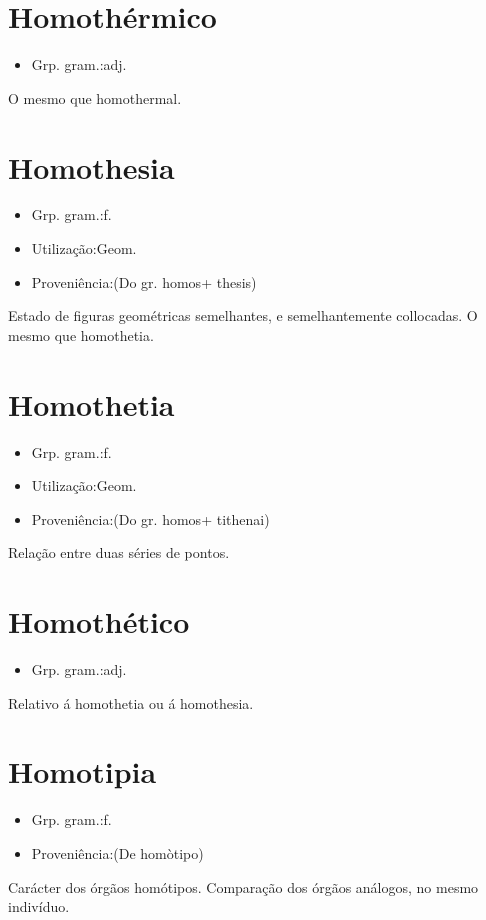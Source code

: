 \documentclass{article}
\begin{document}
\section{Homothérmico}
\begin{itemize}
\item {Grp. gram.:adj.}
\end{itemize}
O mesmo que \textunderscore homothermal\textunderscore .
\section{Homothesia}
\begin{itemize}
\item {Grp. gram.:f.}
\end{itemize}
\begin{itemize}
\item {Utilização:Geom.}
\end{itemize}
\begin{itemize}
\item {Proveniência:(Do gr. \textunderscore homos\textunderscore  + \textunderscore thesis\textunderscore )}
\end{itemize}
Estado de figuras geométricas semelhantes, e semelhantemente collocadas.
O mesmo que \textunderscore homothetia\textunderscore .
\section{Homothetia}
\begin{itemize}
\item {Grp. gram.:f.}
\end{itemize}
\begin{itemize}
\item {Utilização:Geom.}
\end{itemize}
\begin{itemize}
\item {Proveniência:(Do gr. \textunderscore homos\textunderscore  + \textunderscore tithenai\textunderscore )}
\end{itemize}
Relação entre duas séries de pontos.
\section{Homothético}
\begin{itemize}
\item {Grp. gram.:adj.}
\end{itemize}
Relativo á homothetia ou á homothesia.
\section{Homotipia}
\begin{itemize}
\item {Grp. gram.:f.}
\end{itemize}
\begin{itemize}
\item {Proveniência:(De \textunderscore homòtipo\textunderscore )}
\end{itemize}
Carácter dos órgãos homótipos.
Comparação dos órgãos análogos, no mesmo indivíduo.
\end{document}
